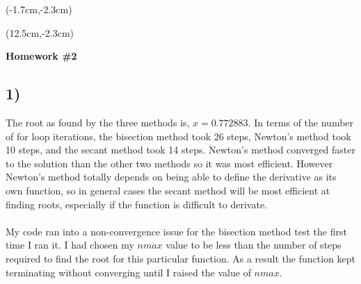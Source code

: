 \documentclass[12pt, oneside]{article}
\begin{document}
\begin{textblock*}{4cm}(-1.7cm,-2.3cm)
\end{textblock*}

\begin{textblock*}{8cm}(12.5cm,-2.3cm)
\end{textblock*}


\vspace{1cm}

\makeatletter
\setlength{\@fptop}{0pt}
\makeatother

\begin{center}
\textbf{\Large Homework \#2}
\end{center}


\subsection*{1)}
The root as found by the three methods is, $x = 0.772883$. In terms of the number of for loop iterations, the bisection method took 26 steps, Newton's method took 10 steps, and the secant method took 14 steps. Newton's method converged faster to the solution than the other two methods so it was most efficient. However Newton's method totally depends on being able to define the derivative as its own function, so in general cases the secant method will be most efficient at finding roots, especially if the function is difficult to derivate.\\\\
My code ran into a non-convergence issue for the bisection method test the first time I ran it. I had chosen my $nmax$ value to be less than the number of steps required to find the root for this particular function. As a result the function kept terminating without converging until I raised the value of $nmax$.\\
\end{document}
